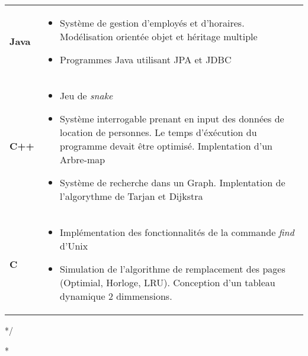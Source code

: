 \documentclass[a4paper,9pt]{extarticle}
\begin{document}
\begin{tabular*}{\linewidth}{p{ }
						 	 p{ }} 
\textbf{Java} &  \vspace{-0.5em}
\begin{itemize}

\item Système de gestion d'employés et d'horaires. Modélisation orientée objet et héritage multiple
\item Programmes Java utilisant  JPA et JDBC 
\end{itemize}
\\
\textbf{C++} & \vspace{-0.5em}

\begin{itemize}
\item Jeu de \emph{snake}
\item Système interrogable prenant en input des données de location de personnes. Le temps d'éxécution du programme devait être optimisé. Implentation d'un Arbre-map
\item Système de recherche dans un Graph. Implentation de l'algorythme de Tarjan et Dijkstra
\end{itemize}
\\
\textbf{C} & \vspace{-0.5em}

\begin{itemize}
\item Implémentation des fonctionnalités de la commande \emph{find} d'Unix
\item Simulation de l'algorithme de remplacement des pages (Optimial, Horloge, LRU). Conception d'un tableau dynamique 2 dimmensions.
\end{itemize}
\end{tabular*}
*/

\/*
\end{document}
